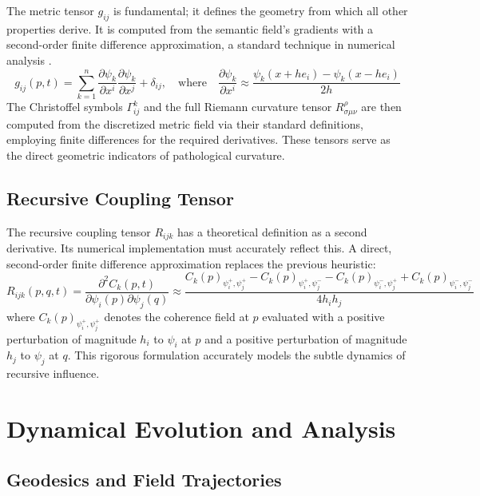 The metric tensor \(g_{ij}\) is fundamental; it defines the geometry from which all other properties derive. It is computed from the semantic field's gradients with a second-order finite difference approximation, a standard technique in numerical analysis \autocite{BurdenFairesBurden2015}.
\begin{equation}
g_{ij}(p,t) = \sum_{k=1}^n \frac{\partial \psi_k}{\partial x^i} \frac{\partial \psi_k}{\partial x^j} + \delta_{ij}, \quad \text{where} \quad \frac{\partial \psi_k}{\partial x^i} \approx \frac{\psi_k(x + h e_i) - \psi_k(x - h e_i)}{2h}
\end{equation}
The Christoffel symbols \(\Gamma^k_{ij}\) and the full Riemann curvature tensor \(R^{\rho}_{\sigma\mu\nu}\) are then computed from the discretized metric field via their standard definitions, employing finite differences for the required derivatives. These tensors serve as the direct geometric indicators of pathological curvature.

\subsection{Recursive Coupling Tensor}

The recursive coupling tensor \(R_{ijk}\) has a theoretical definition as a second derivative. Its numerical implementation must accurately reflect this. A direct, second-order finite difference approximation replaces the previous heuristic:
\begin{equation}
R_{ijk}(p,q,t) = \frac{\partial^2 C_k(p,t)}{\partial \psi_i(p) \partial \psi_j(q)} \approx \frac{C_k(p)_{\psi_i^+,\psi_j^+} - C_k(p)_{\psi_i^+,\psi_j^-} - C_k(p)_{\psi_i^-,\psi_j^+} + C_k(p)_{\psi_i^-,\psi_j^-}}{4h_i h_j}
\end{equation}
where \(C_k(p)_{\psi_i^+,\psi_j^+}\) denotes the coherence field at \(p\) evaluated with a positive perturbation of magnitude \(h_i\) to \(\psi_i\) at \(p\) and a positive perturbation of magnitude \(h_j\) to \(\psi_j\) at \(q\). This rigorous formulation accurately models the subtle dynamics of recursive influence.

\section{Dynamical Evolution and Analysis}

\subsection{Geodesics and Field Trajectories}

